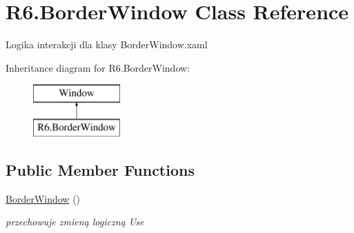 \hypertarget{class_r6_1_1_border_window}{}\section{R6.\+Border\+Window Class Reference}
\label{class_r6_1_1_border_window}


Logika interakcji dla klasy Border\+Window.\+xaml  


Inheritance diagram for R6.\+Border\+Window\+:\begin{figure}[H]
\begin{center}
\leavevmode
\includegraphics[height=2.000000cm]{class_r6_1_1_border_window}
\end{center}
\end{figure}
\subsection*{Public Member Functions}
\begin{DoxyCompactItemize}
\item 
\mbox{\hyperlink{class_r6_1_1_border_window_a2fbd146cdcb26ba0d1797a2b60f36df4}{Border\+Window}} ()
\begin{DoxyCompactList}\small\item\em przechowuje zmieną logiczną Use \end{DoxyCompactList}\end{DoxyCompactItemize}
